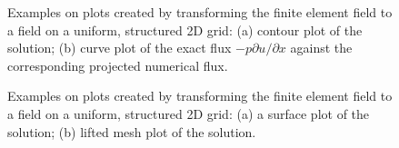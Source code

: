 \begin{figure}
  \begin{center}
  \end{center}
  \caption{Examples on plots created by transforming the finite
    element field to a field on a uniform, structured 2D grid: (a)
    contour plot of the solution; (b) curve plot of the exact flux
    $-p\partial u/\partial x$ against the corresponding projected
    numerical flux.}
  \label{langtangen:poisson:2D:fig2}
\end{figure}

\begin{figure}
  \begin{center}
  \end{center}
  \caption{Examples on plots created by transforming the finite
    element field to a field on a uniform, structured 2D grid: (a) a
    surface plot of the solution; (b) lifted mesh plot of the
  solution.}
  \label{langtangen:poisson:2D:fig3}
\end{figure}

